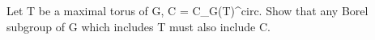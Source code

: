 Let T be a maximal torus of G, C = C_G(T)^circ. Show that any Borel subgroup of G which includes T must also include C.
